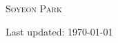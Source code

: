 \documentclass[10pt,letterpaper]{article}
\def\name{\textsc{Soyeon Park}}
\begin{document}
{\Huge \name}


\vspace{0.15in}


% 







%
%


% 
% 


\begin{center}
  \begin{small}
    Last updated: \today
  \end{small}
\end{center}
\end{document}
